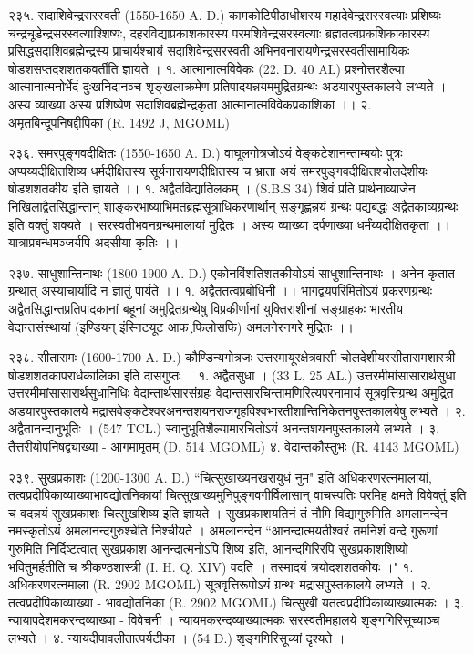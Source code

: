 २३५. सदाशिवेन्द्रसरस्वती (1550-1650 A. D.)
कामकोटिपीठाधीशस्य महादेवेन्द्रसरस्वत्याः प्रशिष्यः चन्द्रचूडेन्द्रसरस्वत्याश्शिष्यः, दहरविद्याप्रकाशकारस्य परमशिवेन्द्रसरस्वत्याः ब्रह्मतत्वप्रकशिकाकारस्य प्रसिद्धसदाशिवब्रह्मेन्द्रस्य प्राचार्यश्चायं सदाशिवेन्द्रसरस्वती अभिनवनारायणेन्द्रसरस्वतीसामायिकः षोडशसप्तदशशतकवर्तीति ज्ञायते ।
१. आत्मानात्मविवेकः (22. D. 40 AL)
प्रश्नोत्तरशैल्या आत्मानात्मनोर्भेदं दुःखनिदानञ्च शृङ्खलाक्रमेण प्रतिपादयन्नयममुद्रितग्रन्थः अडयारपुस्तकालये लभ्यते । अस्य व्याख्या अस्य प्रशिष्येण सदाशिवब्रह्मेन्द्रकृता आत्मानात्मविवेकप्रकाशिका ।।
२. अमृतबिन्दूपनिषद्दीपिका (R. 1492 J, MGOML)

२३६. समरपुङ्गवदीक्षितः (1550-1650 A. D.)
वाघूलगोत्रजोऽयं वेङ्कटेशानन्ताम्बयोः पुत्रः अप्पय्यदीक्षितशिष्य धर्मदीक्षितस्य सूर्यनारायणदीक्षितस्य च भ्राता अयं समरपुङ्गवदीक्षितश्चोलदेशीयः षोडशशतकीय इति ज्ञायते ।।
१. अद्वैतविद्यातिलकम् । (S.B.S 34)
शिवं प्रति प्रार्थनाव्याजेन निखिलाद्वैतसिद्धान्तान् शाङ्करभाष्याभिमतब्रह्मसूत्राधिकरणार्थान् सङ्गृह्णन्नयं ग्रन्थः पद्यबद्धः अद्वैतकाव्यग्रन्थः इति वक्तुं शक्यते । सरस्वतीभवनग्रन्थमालायां मुद्रितः । अस्य व्याख्या दर्पणाख्या धर्मंय्यदीक्षितकृता ।। यात्राप्रबन्धमञ्जर्यपि अदसीया कृतिः ।।

२३७. साधुशान्तिनाथः (1800-1900 A. D.)
एकोनविंशतिशतकीयोऽयं साधुशान्तिनाथः । अनेन कृतात ग्रन्थात् अस्याचार्यादि न ज्ञातुं पार्यते ।।
१. अद्वैततत्वप्रबोधिनी ।। भागद्वयपरिमितोऽयं प्रकरणग्रन्थः अद्वैतसिद्धान्तप्रतिपादकानां बहूनां अमुद्रितग्रन्थेषु विप्रकीर्णानां युक्तिराशीनां सङ्ग्राहकः भारतीय वेदान्तसंस्थायां (इण्डियन् इंस्निटयूट आफ फि़लोसफि) अमलनेरनगरे मुद्रितः ।।

२३८. सीतारामः (1600-1700 A. D.)
कौण्डिन्यगोत्रजः उत्तरमायूरक्षेत्रवासी चोलदेशीयस्सीतारामशास्त्री षोडशशतकापरार्धकालिका इति दासगुप्तः ।
१. अद्वैतसुधा । (33 L. 25 AL.)
उत्तरमीमांसासारार्थसुधा उत्तरमीमांसासारार्थसुधानिधिः वेदान्तार्थसारसंग्रहः वेदान्तसारचिन्तामणिरित्यपरनामायं सूत्रवृत्तिग्रन्थ अमुद्रित अडयारपुस्तकालये मद्रासवेङ्कटेश्वरअनन्तशयनराजगृहविश्वभारतीशान्तिनिकेतनपुस्तकालयेषु लभ्यते । 
२. अद्वैतानन्दानुभूतिः । (547 TCL.) स्वानुभूतिशैल्यामारचितोऽयं अनन्तशयनपुस्तकालये लभ्यते ।
३. तैत्तरीयोपनिषद्व्याख्या - आगमामृतम् (D. 514 MGOML)
४. वेदान्तकौस्तुभः (R. 4143 MGOML)

२३९. सुखप्रकाशः (1200-1300 A. D.)
``चित्सुखाख्यनखरायुधं नुम" इति अधिकरणरत्नमालायां, तत्वप्रदीपिकाव्याख्याभावद्योतनिकायां चित्सुखाख्यमुनिपुङ्गवगीर्विलासान् वाचस्पतिः परमिह क्षमते विवेक्तुं इति च वदन्नयं सुखप्रकाशः चित्सुखशिष्य इति ज्ञायते । सुखप्रकाशयतिनं तं नौमि विद्यागुरुमिति अमलानन्देन नमस्कृतोऽयं अमलानन्दगुरुश्चेति निश्चीयते । अमलानन्देन ``आनन्दात्मयतीश्वरं तमनिशं वन्दे गुरूणां गुरुमिति निर्दिष्टत्वात् सुखप्रकाश आनन्दात्मनोऽपि शिष्य इति, आनन्दगिरिरपि सुखप्रकाशशिष्यो भवितुमर्हतीति च श्रीकण्ठशास्त्री (I. H. Q. XIV) वदति । तस्मादयं त्रयोदशशतकीयः ।"
१. अधिकरणरत्नमाला (R. 2902 MGOML) सूत्रवृत्तिरूपोऽयं ग्रन्थः मद्रासपुस्तकालये लभ्यते ।
२. तत्वप्रदीपिकाव्याख्या - भावद्योतनिका (R. 2902 MGOML) चित्सुखी यतत्वप्रदीपिकाव्याख्यात्मकः ।
३. न्यायापदेशमकरन्दव्याख्या - विवेचनी । न्यायमकरन्दव्याख्यात्मकः सरस्वतीमहालये शृङ्गगिरिसूच्याञ्च लभ्यते ।
४. न्यायदीपावलीतात्पर्यटीका । (54 D.) शृङ्गगिरिसूच्यां दृश्यते ।

